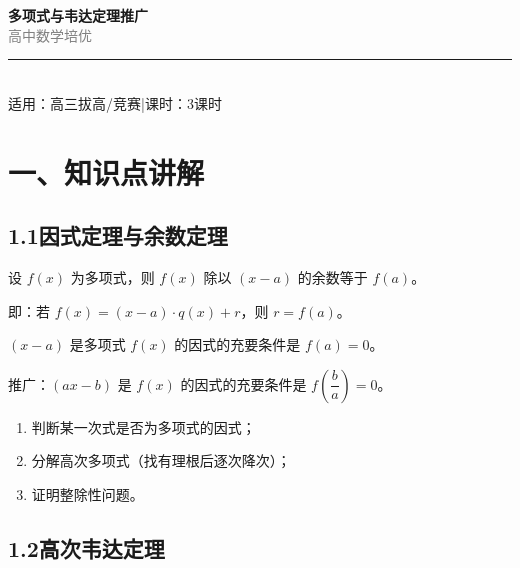 \documentclass[12pt, a4paper]{ctexart}
\begin{document}
\begin{center}
{\Huge\bfseries\textcolor{mainblue}{多项式与韦达定理推广}}\\[12pt]
{\Large\textcolor{gray}{高\quad 中\quad 数\quad 学\quad 培\quad 优}}\\[8pt]
\rule{0.6\textwidth}{1pt}\\[8pt]
{\normalsize 适用：高三拔高/竞赛\quad |\quad 课时：3课时}
\end{center}
\vspace{10pt}

\section*{\textcolor{mainblue}{一、知识点讲解}}

\subsection*{1.1\quad 因式定理与余数定理}

\begin{knowledgebox}
设 $f(x)$ 为多项式，则 $f(x)$ 除以 $(x - a)$ 的余数等于 $f(a)$。

即：若 $f(x) = (x-a) \cdot q(x) + r$，则 $r = f(a)$。
\end{knowledgebox}

\begin{knowledgebox}[因式定理]
$(x-a)$ 是多项式 $f(x)$ 的因式的充要条件是 $f(a)=0$。

推广：$(ax-b)$ 是 $f(x)$ 的因式的充要条件是 $f\!\left(\dfrac{b}{a}\right)=0$。
\end{knowledgebox}

\begin{tipbox}[因式定理的应用场景]
\begin{enumerate}[label=(\arabic*)]
\item 判断某一次式是否为多项式的因式；
\item 分解高次多项式（找有理根后逐次降次）；
\item 证明整除性问题。
\end{enumerate}
\end{tipbox}

\subsection*{1.2\quad 高次韦达定理}
\end{document}
